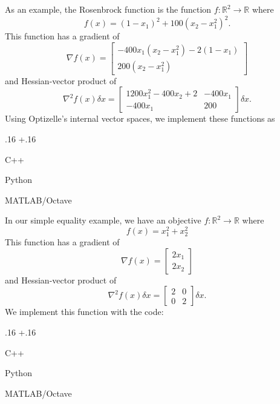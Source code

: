 \documentclass{report}
\newenvironment{boldlist}
    {\begin{list}{}{
        \labelwidth.16\textwidth
        \leftmargin\dimexpr\leftmargin+.16\textwidth
        \renewcommand\makelabel[1]{%
            \textbf{##1}}}}
    {\vspace{-\dimexpr\baselineskip+2\itemsep}\end{list}}
\newcommand{\exampleitem}[2]{
    \item[Language] #1
    \item[Code] #2
    \item[]}
\newcommand{\re}{\mathbb{R}}
\begin{document}
        As an example, the Rosenbrock function is the function $f:\re^2\rightarrow \re$ where 
$$
        f(x)=(1-x_1)^2+100(x_2-x_1^2)^2.
$$
This function has a gradient of
$$
        \nabla f(x)=\begin{bmatrix}
            -400x_1(x_2-x_1^2)-2(1-x_1)\\
            200(x_2-x_1^2)
        \end{bmatrix}
$$
and Hessian-vector product of 
$$
        \nabla^2 f(x)\delta x=
        \begin{bmatrix}
            1200x_1^2-400x_2+2 & -400x_1\\
            -400x_1 & 200
        \end{bmatrix}\delta x.
$$
Using Optizelle's internal vector spaces, we implement these functions as 
\begin{boldlist}
    \exampleitem
        {C++}
        {}

    \exampleitem
        {Python}
        {}

    \exampleitem
        {MATLAB/Octave}
        {}
\end{boldlist}

        In our simple equality example, we have an objective $f:\re^2\rightarrow \re$ where 
$$
        f(x)=x_1^2+x_2^2
$$
This function has a gradient of
$$
        \nabla f(x)=\begin{bmatrix}
            2x_1\\ 
            2x_2
        \end{bmatrix}
$$
and Hessian-vector product of 
$$
        \nabla^2 f(x)\delta x=
        \begin{bmatrix}
            2 & 0\\
            0 & 2
        \end{bmatrix}\delta x.
$$
We implement this function with the code:
\begin{boldlist}
    \exampleitem
        {C++}
        {}

    \exampleitem
        {Python}
        {}

    \exampleitem
        {MATLAB/Octave}
        {}
\end{boldlist}
\end{document}
